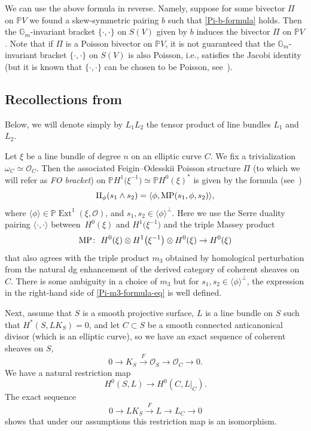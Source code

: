 \documentclass[pdftex]{sigma}
\numberwithin{equation}{section}
\newcommand{\we}{\wedge}
\renewcommand{\P}{{\mathbb P}}
\newcommand{\ot}{\otimes}
\newcommand{\Ext}{\operatorname{Ext}}
\newcommand{\OO}{{\mathcal O}}
\newcommand{\sub}{\subset}
\newcommand{\om}{\omega}
\newcommand{\G}{{\mathbb G}}
\newcommand{\lan}{\langle}
\newcommand{\ran}{\rangle}
\begin{document}
We can use the above formula in reverse. Namely, suppose for some bivector $\Pi$ on $\P V$ we found a skew-symmetric pairing $b$ such that
\eqref{Pi-b-formula} holds. Then the $\G_m$-invariant bracket $\{\cdot,\cdot\}$ on $S(V)$ given by $b$ induces the bivector $\Pi$ on $\P V$.
Note that if $\Pi$ is a Poisson bivector on $\P V$, it is not guaranteed that the $\G_m$-invariant bracket $\{\cdot,\cdot\}$ on $S(V)$ is also Poisson, i.e.,
satisfies the Jacobi identity (but it is known that $\{\cdot,\cdot\}$ can be chosen to be Poisson, see~\cite{B, P95}).

\subsection[Recollections from~\protect{[3]}]{Recollections from~\cite{HP}}

Below, we will denote simply by $L_1L_2$ the tensor product of line bundles $L_1$ and $L_2$.

Let $\xi$ be a line bundle of degree $n$ on an elliptic curve $C$. We fix a trivialization $\om_C\simeq \OO_C$.
Then the associated Feigin--Odesskii Poisson structure $\Pi$ (to which we will refer as {\it FO bracket}) on $\P H^1\big(\xi^{-1}\big)\simeq \P H^0(\xi)^*$ is given by the formula (see~\cite[Lemma~2.1]{HP})
\begin{equation}\label{Pi-m3-formula-eq}
\Pi_{\phi}(s_1\we s_2)=\lan \phi, {\rm MP}(s_1,\phi,s_2)\ran,
\end{equation}
where $\lan\phi\ran\in \P\Ext^1(\xi,\OO)$, and $s_1,s_2\in \lan \phi\ran^\perp$.
Here we use the Serre duality pairing $\lan \cdot,\cdot\ran$ between~$H^0(\xi)$ and $H^1\big(\xi^{-1}\big)$ and the triple Massey product
\[
{\rm MP}\colon \ H^0(\xi)\ot H^1\big(\xi^{-1}\big)\ot H^0(\xi)\to H^0(\xi)
\]
that also agrees with the triple product $m_3$ obtained by homological perturbation from the natural dg enhancement of the derived category of coherent sheaves on $C$.
There is some ambiguity in a choice of $m_3$ but for $s_1,s_2\in \lan\phi\ran^{\perp}$, the expression in the right-hand side of
\eqref{Pi-m3-formula-eq} is well defined.

Next, assume that $S$ is a smooth projective surface, $L$ is a line bundle on $S$ such that $H^*(S,LK_S)=0$, and let $C\sub S$
be a smooth connected anticanonical divisor (which is an elliptic curve), so we have an exact sequence of coherent sheaves on $S$,
\begin{equation}
0\to K_S\overset{F}{\to} \OO_S\to \OO_C\to 0.\label{KS-O-OC-ex-seq}
\end{equation}
We have a natural restriction map
\[H^0(S,L)\to H^0(C,L|_C).\]
The exact sequence
\begin{equation}
0\to LK_S\overset{F}{\to} L\to L_C\to 0\label{LKS-L-LC-ex-seq}
\end{equation}
shows that under our assumptions this restriction map is an isomorphism.
\end{document}
